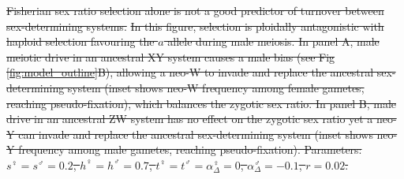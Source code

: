 \documentclass[10pt,letterpaper]{article}
\providecommand{\DIFdeltex}[1]{{\protect\color{red}\sout{#1}}}                      %
\providecommand{\DIFdelbegin}{} %
\providecommand{\DIFdelFL}[1]{\DIFdel{#1}} %
\providecommand{\DIFdel}[1]{\texorpdfstring{\DIFdeltex{#1}}{}} %
\newcommand{\DIFscaledelfig}{0.5}
\newlength{\DIFdelgraphicswidth} %
\newlength{\DIFdelgraphicsheight} %
\newcommand{\DIFdelincludegraphics}[2][]{%
\sbox{\DIFdelgraphicsbox}{\DIFOincludegraphics[#1]{#2}}%
\settoboxwidth{\DIFdelgraphicswidth}{\DIFdelgraphicsbox} %
\settoboxtotalheight{\DIFdelgraphicsheight}{\DIFdelgraphicsbox} %
\scalebox{\DIFscaledelfig}{%
\parbox[b]{\DIFdelgraphicswidth}{\usebox{\DIFdelgraphicsbox}\\[-\baselineskip] \rule{\DIFdelgraphicswidth}{0em}}\llap{\resizebox{\DIFdelgraphicswidth}{\DIFdelgraphicsheight}{%
\setlength{\unitlength}{\DIFdelgraphicswidth}%
\begin{picture}(1,1)%
\thicklines\linethickness{2pt} %
{\color[rgb]{1,0,0}\put(0,0){\framebox(1,1){}}}%
{\color[rgb]{1,0,0}\put(0,0){\line( 1,1){1}}}%
{\color[rgb]{1,0,0}\put(0,1){\line(1,-1){1}}}%
\end{picture}%
}\hspace*{3pt}}} %
} %
\DeclareRobustCommand{\DIFdelbegin}{\DIFOdelbegin \let\includegraphics\DIFdelincludegraphics} %
\begin{document}
\DIFdelbegin %
{%
\DIFdelFL{Fisherian sex ratio selection alone is not a good predictor of turnover between sex-determining systems.}%
\DIFdelFL{In this figure, selection is ploidally antagonistic with haploid selection favouring the $a$ allele during male meiosis.
In panel A, male meiotic drive in an ancestral XY system causes a male bias (see Fig \ref{fig:model_outline}B), allowing a neo-W to invade and replace the ancestral sex-determining system (inset shows neo-W frequency among female gametes, reaching pseudo-fixation), which balances the zygotic sex ratio.
In panel B, male drive in an ancestral ZW system has no effect on the zygotic sex ratio yet a neo-Y can invade and replace the ancestral sex-determining system (inset shows neo-Y frequency among male gametes, reaching pseudo-fixation). 
Parameters:  $s^\female =s^\male = 0.2$, $h^\female = h^\male = 0.7$, $t^\female = t^\male = \alpha^\female_\Delta = 0$, $\alpha^\male_\Delta = -0.1$, $r=0.02$.
}}
\end{document}
